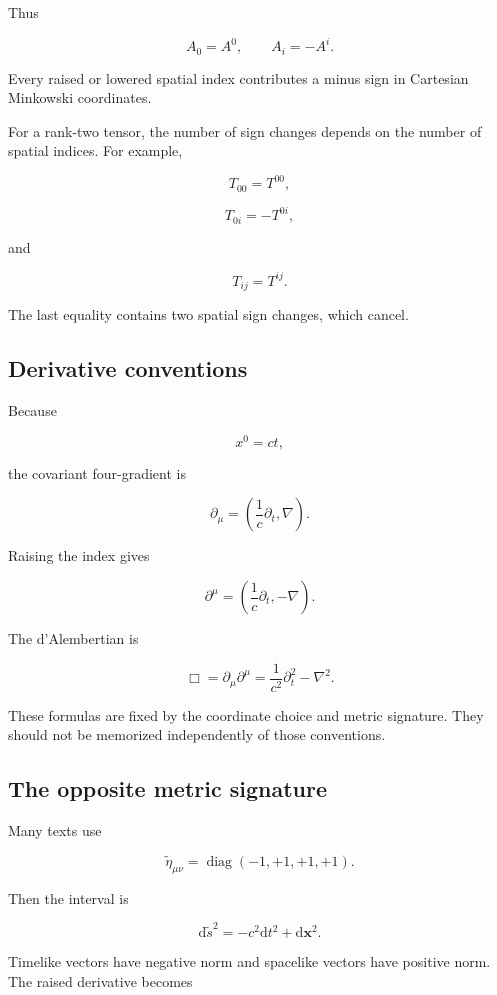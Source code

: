 Thus

\[
A_{0}=A^{0},
\qquad
A_{i}=-A^{i}.
\]

Every raised or lowered spatial index contributes a minus sign in Cartesian Minkowski coordinates.

For a rank-two tensor, the number of sign changes depends on the number of spatial indices. For example,

\[
T_{00}=T^{00},
\]

\[
T_{0i}=-T^{0i},
\]

and

\[
T_{ij}=T^{ij}.
\]

The last equality contains two spatial sign changes, which cancel.

\subsection{Derivative conventions}

Because

\[
x^{0}=ct,
\]

the covariant four-gradient is

\[
\boxed{
\partial_{\mu}
=
\left(
\frac{1}{c}\partial_{t},
\nabla
\right)
}.
\]

Raising the index gives

\[
\boxed{
\partial^{\mu}
=
\left(
\frac{1}{c}\partial_{t},
-\nabla
\right)
}.
\]

The d'Alembertian is

\[
\boxed{
\Box
=
\partial_{\mu}\partial^{\mu}
=
\frac{1}{c^{2}}\partial_{t}^{2}
-
\nabla^{2}
}.
\]

These formulas are fixed by the coordinate choice and metric signature. They should not be memorized independently of those conventions.

\subsection{The opposite metric signature}

Many texts use

\[
\widetilde{\eta}_{\mu\nu}
=
\operatorname{diag}(-1,+1,+1,+1).
\]

Then the interval is

\[
\mathrm{d}\widetilde{s}^{2}
=
-c^{2}\mathrm{d}t^{2}
+
\mathrm{d}\mathbf{x}^{2}.
\]

Timelike vectors have negative norm and spacelike vectors have positive norm. The raised derivative becomes

